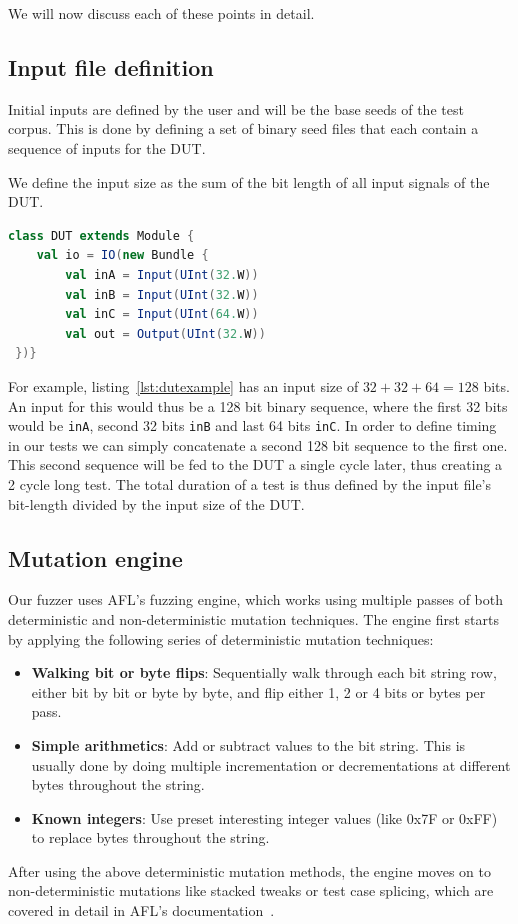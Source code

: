 \documentclass[conference]{IEEEtran}
\newcommand{\todo}[1]{{\color{olive} TODO: #1}}
\begin{document}
We will now discuss each of these points in detail.  
\subsection{Input file definition} 
Initial inputs are defined by the user and will be the base seeds of the test corpus.
This is done by defining a set of binary seed files that each contain a sequence of inputs for the DUT.

We define the input size as the sum of the bit length of all input signals of the DUT.
\begin{lstlisting}[captionpos=b,caption={Basic DUT with two 32 bit inputs, one 64 input, as well as a 32 bit output.},label={lst:dutexample},language=scala]
class DUT extends Module {
    val io = IO(new Bundle {
        val inA = Input(UInt(32.W))
        val inB = Input(UInt(32.W))
        val inC = Input(UInt(64.W))
        val out = Output(UInt(32.W))
 })}
\end{lstlisting}
For example, listing~\ref{lst:dutexample} has an input size of $32 + 32 + 64 = 128$ bits.
An input for this would thus be a 128 bit binary sequence, where the first 32 bits would be \texttt{inA}, second 32 bits \texttt{inB} and last 64 bits \texttt{inC}.
In order to define timing in our tests we can simply concatenate a second 128 bit sequence to the first one.
This second sequence will be fed to the DUT a single cycle later, thus creating a 2 cycle long test.
The total duration of a test is thus defined by the input file's bit-length divided by the input size of the DUT.

\subsection{Mutation engine}
Our fuzzer uses AFL's fuzzing engine, which works using multiple passes of both deterministic and non-deterministic mutation techniques.
The engine first starts by applying  the following series of deterministic mutation techniques:
\begin{itemize}
\item \textbf{Walking bit or byte flips}: Sequentially walk through each bit string row, either bit by bit or byte by byte, and flip either 1, 2 or 4 bits or bytes per pass.
\item \textbf{Simple arithmetics}: Add or subtract values to the bit string. This is usually done by doing multiple incrementation or decrementations at different bytes throughout the string.
\item \textbf{Known integers}: Use preset interesting integer values (like 0x7F or 0xFF) to replace bytes throughout the string.
\end{itemize}
After using the above deterministic mutation methods, the engine moves on to non-deterministic mutations like stacked tweaks or test case splicing, which are covered in detail in AFL's documentation~\cite{afl:fuzzingtechniques}.
\end{document}
